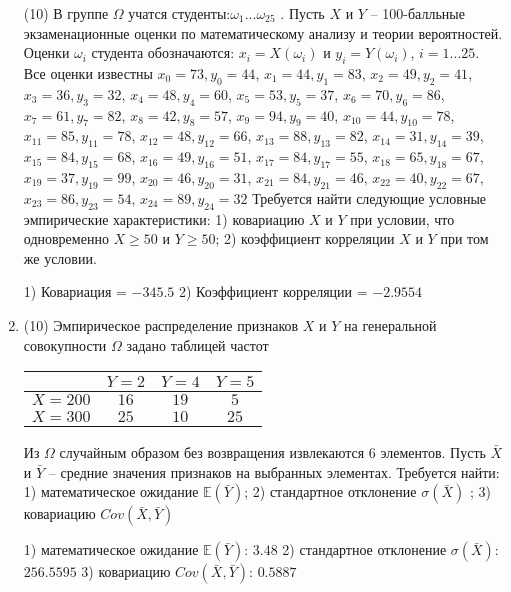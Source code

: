 \documentclass[a4paper,12pt]{article}
\begin{document}
\begin{enumerate}
(10) В группе $\Omega$ учатся студенты:$\omega _{1}...\omega _{25}$ . Пусть $X$ и $Y$ – 100-балльные экзаменационные оценки по
математическому анализу и теории вероятностей. Оценки $\omega _{i}$ студента обозначаются: $x _{i} = X(\omega _{i})$ и $y _{i} = Y(\omega _{i})$, $i = 1...25$. Все оценки известны
$x _{0} = 73, y _{0} = 44$, $x _{1} = 44, y _{1} = 83$, $x _{2} = 49, y _{2} = 41$, $x _{3} = 36, y _{3} = 32$, $x _{4} = 48, y _{4} = 60$, $x _{5} = 53, y _{5} = 37$, $x _{6} = 70, y _{6} = 86$, $x _{7} = 61, y _{7} = 82$, $x _{8} = 42, y _{8} = 57$, $x _{9} = 94, y _{9} = 40$, $x _{10} = 44, y _{10} = 78$, $x _{11} = 85, y _{11} = 78$, $x _{12} = 48, y _{12} = 66$, $x _{13} = 88, y _{13} = 82$, $x _{14} = 31, y _{14} = 39$, $x _{15} = 84, y _{15} = 68$, $x _{16} = 49, y _{16} = 51$, $x _{17} = 84, y _{17} = 55$, $x _{18} = 65, y _{18} = 67$, $x _{19} = 37, y _{19} = 99$, $x _{20} = 46, y _{20} = 31$, $x _{21} = 84, y _{21} = 46$, $x _{22} = 40, y _{22} = 67$, $x _{23} = 86, y _{23} = 54$, $x _{24} = 89, y _{24} = 32$
Требуется
найти следующие условные эмпирические характеристики: 1) ковариацию $X$ и $Y$ при условии, что одновременно $X \geqslant 50$
 и $Y \geqslant 50$; 2) коэффициент корреляции $X$ и $Y$ при том же условии.




1) Ковариация = $-345.5$
2) Коэффициент корреляции = $-2.9554$


\item


(10) Эмпирическое распределение признаков $X$ и $Y$ на генеральной совокупности $\Omega$ задано таблицей частот  
 
\begin{tabular}{ | c | c | c | c | }
\hline
 & $Y = 2$ & $Y = 4$ & $Y = 5$  \\ \hline
$X = 200$ & $16$ & $19$ & $5$\\ \hline
$X = 300$ & $25$ & $10$ & $25$\\
\hline
\end{tabular}

Из $\Omega$ случайным образом без возвращения извлекаются $6$ элементов. 
Пусть $\bar X$ и $\bar Y$ – средние значения признаков на выбранных элементах. 
Требуется найти: 1) математическое ожидание $\mathbb{E}(\bar Y)$; 2) стандартное отклонение $\sigma(\bar X)$ ; 
3) ковариацию $Cov(\bar X, \bar Y)$




1) математическое ожидание $\mathbb{E}(\bar Y)$: $3.48$ 
2) стандартное отклонение $\sigma(\bar X)$: $256.5595$
3) ковариацию $Cov(\bar X, \bar Y)$: $0.5887$



\end{enumerate}
\end{document}

